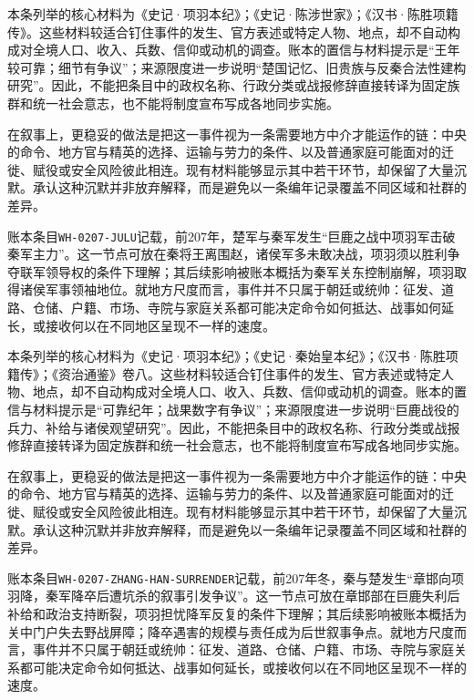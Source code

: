 本条列举的核心材料为《史记·项羽本纪》；《史记·陈涉世家》；《汉书·陈胜项籍传》。这些材料较适合钉住事件的发生、官方表述或特定人物、地点，却不自动构成对全境人口、收入、兵数、信仰或动机的调查。账本的置信与材料提示是“王年较可靠；细节有争议”；来源限度进一步说明“楚国记忆、旧贵族与反秦合法性建构研究”。因此，不能把条目中的政权名称、行政分类或战报修辞直接转译为固定族群和统一社会意志，也不能将制度宣布写成各地同步实施。

在叙事上，更稳妥的做法是把这一事件视为一条需要地方中介才能运作的链：中央的命令、地方官与精英的选择、运输与劳力的条件、以及普通家庭可能面对的迁徙、赋役或安全风险彼此相连。现有材料能够显示其中若干环节，却保留了大量沉默。承认这种沉默并非放弃解释，而是避免以一条编年记录覆盖不同区域和社群的差异。

账本条目\texttt{WH-0207-JULU}记载，前207年，楚军与秦军发生“巨鹿之战中项羽军击破秦军主力”。这一节点可放在秦将王离围赵，诸侯军多未敢决战，项羽须以胜利争夺联军领导权的条件下理解；其后续影响被账本概括为秦军关东控制崩解，项羽取得诸侯军事领袖地位。就地方尺度而言，事件并不只属于朝廷或统帅：征发、道路、仓储、户籍、市场、寺院与家庭关系都可能决定命令如何抵达、战事如何延长，或接收何以在不同地区呈现不一样的速度。

本条列举的核心材料为《史记·项羽本纪》；《史记·秦始皇本纪》；《汉书·陈胜项籍传》；《资治通鉴》卷八。这些材料较适合钉住事件的发生、官方表述或特定人物、地点，却不自动构成对全境人口、收入、兵数、信仰或动机的调查。账本的置信与材料提示是“可靠纪年；战果数字有争议”；来源限度进一步说明“巨鹿战役的兵力、补给与诸侯观望研究”。因此，不能把条目中的政权名称、行政分类或战报修辞直接转译为固定族群和统一社会意志，也不能将制度宣布写成各地同步实施。

在叙事上，更稳妥的做法是把这一事件视为一条需要地方中介才能运作的链：中央的命令、地方官与精英的选择、运输与劳力的条件、以及普通家庭可能面对的迁徙、赋役或安全风险彼此相连。现有材料能够显示其中若干环节，却保留了大量沉默。承认这种沉默并非放弃解释，而是避免以一条编年记录覆盖不同区域和社群的差异。

账本条目\texttt{WH-0207-ZHANG-HAN-SURRENDER}记载，前207年冬，秦与楚发生“章邯向项羽降，秦军降卒后遭坑杀的叙事引发争议”。这一节点可放在章邯部在巨鹿失利后补给和政治支持断裂，项羽担忧降军反复的条件下理解；其后续影响被账本概括为关中门户失去野战屏障；降卒遇害的规模与责任成为后世叙事争点。就地方尺度而言，事件并不只属于朝廷或统帅：征发、道路、仓储、户籍、市场、寺院与家庭关系都可能决定命令如何抵达、战事如何延长，或接收何以在不同地区呈现不一样的速度。

